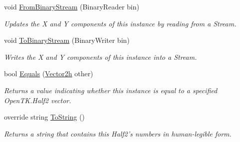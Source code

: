 \begin{DoxyCompactItemize}
void \hyperlink{struct_open_t_k_1_1_vector2h_ae86af493fc315b2bfe39e12f7bfd9324}{From\-Binary\-Stream} (Binary\-Reader bin)
\begin{DoxyCompactList}\small\item\em Updates the X and Y components of this instance by reading from a Stream.\end{DoxyCompactList}\item 
void \hyperlink{struct_open_t_k_1_1_vector2h_a7a51e88dd8bbf12cb0de4d59ab310854}{To\-Binary\-Stream} (Binary\-Writer bin)
\begin{DoxyCompactList}\small\item\em Writes the X and Y components of this instance into a Stream.\end{DoxyCompactList}\item 
bool \hyperlink{struct_open_t_k_1_1_vector2h_acaacfb94f9345ceb7b1ba69a94832b79}{Equals} (\hyperlink{struct_open_t_k_1_1_vector2h}{Vector2h} other)
\begin{DoxyCompactList}\small\item\em Returns a value indicating whether this instance is equal to a specified Open\-T\-K.\-Half2 vector.\end{DoxyCompactList}\item 
override string \hyperlink{struct_open_t_k_1_1_vector2h_a8628970221af258cb5368a6758d70786}{To\-String} ()
\begin{DoxyCompactList}\small\item\em Returns a string that contains this Half2's numbers in human-\/legible form.\end{DoxyCompactList}\end{DoxyCompactItemize}

